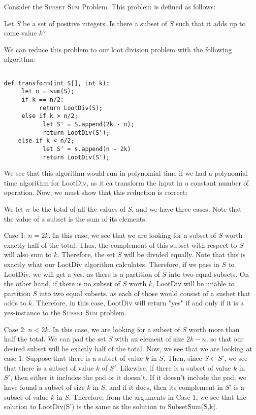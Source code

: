 \documentclass{article}
\begin{document}
Consider the \textsc{Subset Sum} Problem.  This problem is defined as follows:

Let $S$ be a set of positive integers.  Is there a subset of $S$ such that it adds up to some value $k$?

We can reduce this problem to our loot division problem with the following algorithm:

\begin{verbatim}

def transform(int S[], int k):
     let n = sum(S);
     if k == n/2:
          return LootDiv(S);
     else if k > n/2;
           let S' = S.append(2k - n);
           return LootDiv(S');
    else if k < n/2;
           let S' = s.append(n - 2k)
           return LootDiv(S');

\end{verbatim}


We see that this algorithm would run in polynomial time if we had a polynomial time algorithm for LootDiv, as it ca transform the input in a constant number of operation.  Now, we must show that this reduction is correct:

We let $n$ be the total of all the values of $S$, and we have three cases.  Note that the value of a subset is the sum of its elements.

Case 1: $n = 2k$.  In this case, we see that we are looking for a subset of $S$ worth exactly half of the total.  Thus, the complement of this subset with respect to $S$ will also sum to $k$.  Therefore, the set $S$ will be divided equally.  Note that this is exactly what our LootDiv algorithm calculates.  Therefore, if we pass in $S$ to LootDiv, we will get a yes, as there is a partition of $S$ into two equal subsets.  On the other hand, if there is no subset of $S$ worth $k$, LootDiv will be unable to partition $S$ into two equal subsets, as each of those would consist of a susbet that adds to $k$.  Therefore, in this case, LootDiv will return "yes" if and only if it is a yes-instance to the \textsc{Subset Sum} problem.

Case 2: $n < 2k$.  In this case, we are looking for a subset of $S$ worth more than half the total.  We can pad the set $S$ with an element of size $2k - n$, so that our desired subset will be exactly half of the total.  Now, we see that we are looking at case 1.  Suppose that there is a subset of value $k$ in $S$.  Then, since $S \subset S'$, we see that there is a subset of value $k$ of $S'$.  Likewise, if there is a subset of value $k$ in $S'$, then either it includes the pad or it doesn't.  If it doesn't include the pad, we have found a subset of size $k$ in $S$, and if it does, then its complement in $S'$ is a subset of value $k$ in $S$.  Therefore, from the arguments in Case 1, we see that the solution to LootDiv(S') is the same as the solution to SubsetSum(S,k).
\end{document}
